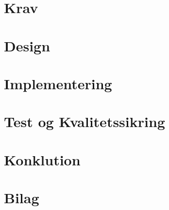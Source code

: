 \documentclass[11pt,a4paper]{article}  	%
\begin{document}
\newpage
\section{Krav}


\newpage
\section{Design}


\newpage
\section{Implementering}


\newpage
\section{Test og Kvalitetssikring}


\section{Konklution}



\newpage
\section{Bilag}

\end{document}
